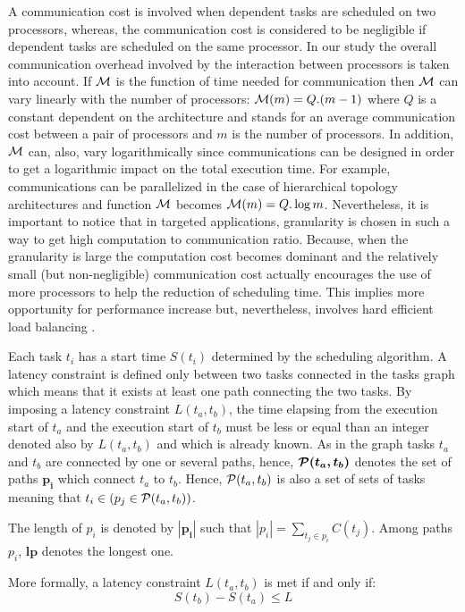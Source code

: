 \documentclass{ijcaArticle}
\begin{document}
A communication cost is involved when dependent tasks are scheduled on two processors, whereas, the communication cost is considered to be negligible if dependent tasks are scheduled on the same processor.   In our study the overall communication overhead involved by the interaction between processors is taken into account.  If ${\cal M}$ is the function of time needed for communication then ${\cal M}$  can vary linearly with the number of processors:  ${\cal M}(m) = Q . (m-1)$ where $Q$ is a constant dependent on the architecture and stands for an average communication cost between a pair of processors and $m$ is the number of processors. In addition,   ${\cal M}$ can, also, vary logarithmically since communications can be designed in order to get a logarithmic impact on the total execution time. For example, communications can be parallelized in the case of hierarchical topology architectures and function ${\cal M}$ becomes ${\cal M}(m)  = Q.\log{m}$. Nevertheless, it is important to notice that in targeted applications, granularity is chosen in such a way to get high computation to communication ratio. 
Because, when the granularity is large the computation cost becomes dominant  and the relatively small (but non-negligible) communication cost actually encourages the use of more processors to help the reduction of scheduling time. This implies more opportunity for performance increase but, nevertheless, involves hard efficient load balancing \cite{Book:IntroductionToParallelComputing}.


Each task $t_i$ has a start time $S(t_i)$ determined by the scheduling algorithm.  A latency constraint is defined only between two tasks connected in the tasks graph which means that it exists at least one path connecting the two tasks. By imposing a latency constraint
$L({t_a,t_b})$, the time elapsing from the execution start of $t_a$ and the execution start of $t_b$ must be less or equal than an integer denoted also by $L({t_a,t_b})$ and which is already known. As in the graph tasks $t_a$ and $t_b$ are connected by one or several paths, hence, $\boldsymbol{{\cal P}(t_a,t_b)}$ denotes the set of paths $\boldsymbol{p_i}$ which connect $t_a$ to $t_b$.  Hence, ${\cal P}(t_a,t_b)$ is also a set of sets of tasks meaning that $t_i \in (p_j \in {\cal P}(t_a,t_b))$. 

The length  of $p_i$ is denoted by $\boldsymbol{|p_i|}$ such that $|p_i| = \sum_{t_j \in p_i} C(t_j)$. Among paths $p_i$,  $\boldsymbol{ lp}$  denotes the longest one.  

More formally, a latency constraint  $L({t_a,t_b})$ is met if and only if:
\begin{equation}
  S(t_b) - S(t_a) \leq L  
\end{equation}
\end{document}
